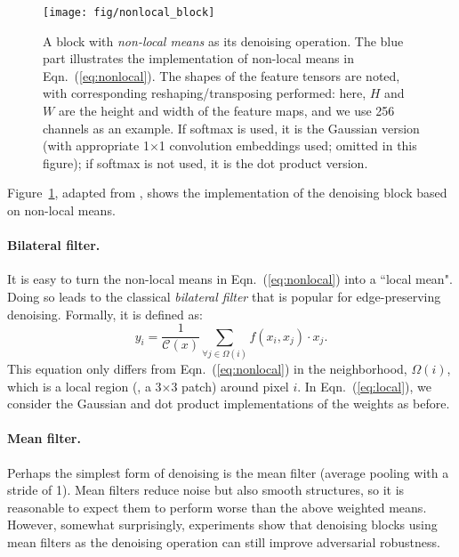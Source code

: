 \documentclass[10pt,twocolumn,letterpaper]{article}
\begin{document}
\begin{figure}[t]
\centering
\texttt{[image: fig/nonlocal\_block]}
\caption{A block with \emph{non-local means} as its denoising operation. The blue part illustrates the implementation of non-local means in Eqn.~(\ref{eq:nonlocal}). The shapes of the feature tensors are noted, with corresponding reshaping/transposing performed: here, $H$ and $W$ are the height and width of the feature maps, and we use 256 channels as an example.
If softmax is used, it is the Gaussian version (with appropriate 1$\times$1 convolution embeddings used; omitted in this figure); if softmax is not used, it is the dot product version.}
\vspace{-.1em}
\label{fig:nonlocal_block}
\end{figure}


\noindent Figure~\ref{fig:nonlocal_block}, adapted from \cite{Wang2018}, shows the implementation of the denoising block based on non-local means.

\paragraph{Bilateral filter.} It is easy to turn the non-local means in Eqn.~(\ref{eq:nonlocal}) into a ``local mean". Doing so leads to the classical \emph{bilateral filter} \cite{Tomasi1998} that is popular for edge-preserving denoising. Formally, it is defined as:
\begin{equation}
\label{eq:local}
y_i = \frac{1}{\mathcal{C}(x)} \sum_{\forall j \in \Omega(i)} f(x_i, x_j)\cdot x_j.
\end{equation}
This equation only differs from Eqn.~(\ref{eq:nonlocal}) in the neighborhood, $\Omega(i)$, which is a local region (\eg, a 3$\times$3 patch) around pixel $i$. In Eqn.~(\ref{eq:local}), we consider the Gaussian and dot product implementations of the weights as before.

\paragraph{Mean filter.} Perhaps the simplest form of denoising is the mean filter (average pooling with a stride of 1). Mean filters reduce noise but also smooth structures, so it is reasonable to expect them to perform worse than the above weighted means. However, somewhat surprisingly, experiments show that denoising blocks using mean filters as the denoising operation can still improve adversarial robustness.
\end{document}
